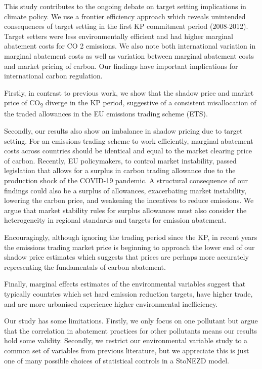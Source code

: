 \documentclass[
  letterpaper,
  DIV=11,
  numbers=noendperiod]{scrartcl}
\begin{document}
This study contributes to the ongoing debate on target setting
implications in climate policy. We use a frontier efficiency approach
which reveals unintended consequences of target setting in the first KP
commitment period (2008-2012). Target setters were less environmentally
efficient and had higher marginal abatement costs for CO 2 emissions. We
also note both international variation in marginal abatement costs as
well as variation between marginal abatement costs and market pricing of
carbon. Our findings have important implications for international
carbon regulation.

Firstly, in contrast to previous work, we show that the shadow price and
market price of CO\textsubscript{2} diverge in the KP period, suggestive
of a consistent misallocation of the traded allowances in the EU
emissions trading scheme (ETS).

Secondly, our results also show an imbalance in shadow pricing due to
target setting. For an emissions trading scheme to work efficiently,
marginal abatement costs across countries should be identical and equal
to the market clearing price of carbon. Recently, EU policymakers, to
control market instability, passed legislation that allows for a surplus
in carbon trading allowance due to the production shock of the COVID-19
pandemic. A structural consequence of our findings could also be a
surplus of allowances, exacerbating market instability, lowering the
carbon price, and weakening the incentives to reduce emissions. We argue
that market stability rules for surplus allowances must also consider
the heterogeneity in regional standards and targets for emission
abatement.

Encouragingly, although ignoring the trading period since the KP, in
recent years the emissions trading market price is beginning to approach
the lower end of our shadow price estimates which suggests that prices
are perhaps more accurately representing the fundamentals of carbon
abatement.

Finally, marginal effects estimates of the environmental variables
suggest that typically countries which set hard emission reduction
targets, have higher trade, and are more urbanised experience higher
environmental inefficiency.

Our study has some limitations. Firstly, we only focus on one pollutant
but argue that the correlation in abatement practices for other
pollutants means our results hold some validity. Secondly, we restrict
our environmental variable study to a common set of variables from
previous literature, but we appreciate this is just one of many possible
choices of statistical controls in a StoNEZD model.
\end{document}
